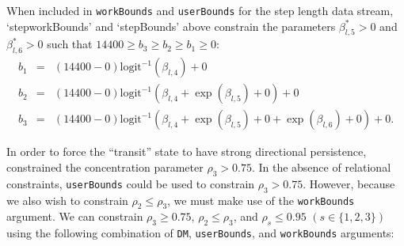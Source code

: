 \documentclass[12pt]{article}\usepackage[]{graphicx}\usepackage[]{color}
\begin{document}
When included in \verb|workBounds| and \verb|userBounds| for the step length data stream, `stepworkBounds' and `stepBounds' above constrain the parameters $\beta^*_{l,5}>0$ and $\beta^*_{l,6}>0$ such that $14400 \ge b_3 \ge b_2 \ge b_1 \ge 0$:
\begin{eqnarray*}
b_1 &=& \left(14400-0\right) \text{logit}^{-1} \left( \beta_{l,4} \right) + 0 \\
b_2 &=& \left(14400-0\right) \text{logit}^{-1} \left( \beta_{l,4} + \exp(\beta_{l,5}) + 0 \right) + 0 \\
b_3 &=& \left(14400-0\right) \text{logit}^{-1} \left( \beta_{l,4} + \exp(\beta_{l,5}) + 0 + \exp(\beta_{l,6}) + 0\right) + 0.
\end{eqnarray*}

In order to force the ``transit'' state to have strong directional persistence, \cite{McClintockEtAl2013c} constrained the concentration parameter $\rho_3>0.75$. In the absence of relational constraints, \verb|userBounds| could be used to constrain $\rho_3>0.75$.  However, because we also wish to constrain  $\rho_2 \le \rho_3$, we must make use of the \verb|workBounds| argument.  We can constrain $\rho_3 \ge 0.75$, $\rho_2 \le \rho_3$, and $\rho_s \le 0.95$ $(s \in \{ 1,2,3 \})$ using the following combination of \verb|DM|, \verb|userBounds|, and \verb|workBounds| arguments:
\end{document}
